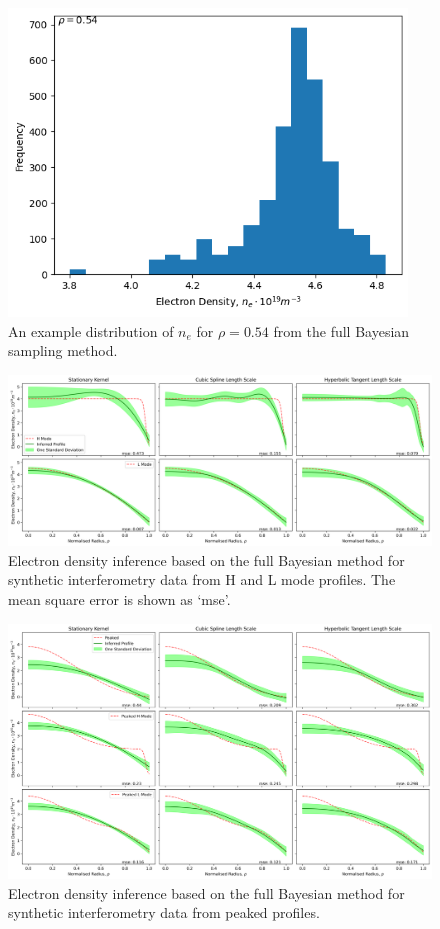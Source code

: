 \begin{figure}[ht]
    \centering
    \includegraphics[width=300pt]{images/Final/sampled_ne_dist.png}
    \caption{An example distribution of $n_e$ for $\rho=0.54$ from the full Bayesian sampling method.}
    \label{fig:ne_dist}
\end{figure}

\begin{figure}[ht]
    \centering
    \includegraphics[width=500pt, angle=90]{images/Final/FB6000compute_noMAP_hl_burn1000_thin10.png}
    \caption{Electron density inference based on the full Bayesian method for synthetic interferometry data from H and L mode profiles. The mean square error is shown as `mse'.}
    \label{fig:fb_inference_hl}
\end{figure}


\begin{figure}[ht]
    \centering
    \includegraphics[width=500pt, angle=90]{images/Final/FB6000compute_noMAP_p_burn1000_thin10.png}
    \caption{Electron density inference based on the full Bayesian method for synthetic interferometry data from peaked profiles.}
    \label{fig:fb_inference_p}
\end{figure}

